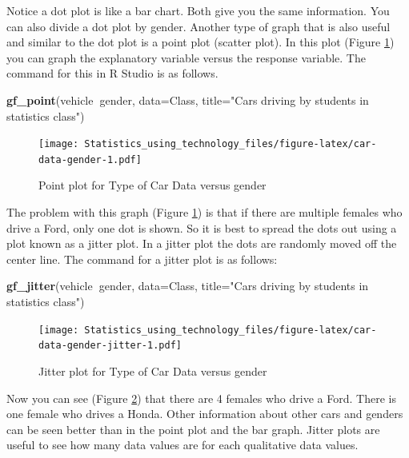 \documentclass[
]{book}
\newenvironment{Shaded}{\begin{snugshade}}{\end{snugshade}}
\newcommand{\DataTypeTok}[1]{\textcolor[rgb]{0.13,0.29,0.53}{#1}}
\newcommand{\KeywordTok}[1]{\textcolor[rgb]{0.13,0.29,0.53}{\textbf{#1}}}
\newcommand{\NormalTok}[1]{#1}
\newcommand{\OperatorTok}[1]{\textcolor[rgb]{0.81,0.36,0.00}{\textbf{#1}}}
\newcommand{\StringTok}[1]{\textcolor[rgb]{0.31,0.60,0.02}{#1}}
\begin{document}
Notice a dot plot is like a bar chart. Both give you the same information. You can also divide a dot plot by gender. Another type of graph that is also useful and similar to the dot plot is a point plot (scatter plot). In this plot (Figure \ref{fig:car-data-gender}) you can graph the explanatory variable versus the response variable. The command for this in R Studio is as follows.



\begin{Shaded}
\begin{Highlighting}[]
\KeywordTok{gf_point}\NormalTok{(vehicle}\OperatorTok{~}\NormalTok{gender, }\DataTypeTok{data=}\NormalTok{Class, }\DataTypeTok{title=}\StringTok{"Cars driving by students in statistics class"}\NormalTok{)}
\end{Highlighting}
\end{Shaded}

\begin{figure}
\centering
\texttt{[image: Statistics\_using\_technology\_files/figure-latex/car-data-gender-1.pdf]}
\caption{\label{fig:car-data-gender}Point plot for Type of Car Data versus gender}
\end{figure}

The problem with this graph (Figure \ref{fig:car-data-gender}) is that if there are multiple females who drive a Ford, only one dot is shown. So it is best to spread the dots out using a plot known as a jitter plot. In a jitter plot the dots are randomly moved off the center line. The command for a jitter plot is as follows:



\begin{Shaded}
\begin{Highlighting}[]
\KeywordTok{gf_jitter}\NormalTok{(vehicle}\OperatorTok{~}\NormalTok{gender, }\DataTypeTok{data=}\NormalTok{Class, }\DataTypeTok{title=}\StringTok{"Cars driving by students in statistics class"}\NormalTok{)}
\end{Highlighting}
\end{Shaded}

\begin{figure}
\centering
\texttt{[image: Statistics\_using\_technology\_files/figure-latex/car-data-gender-jitter-1.pdf]}
\caption{\label{fig:car-data-gender-jitter}Jitter plot for Type of Car Data versus gender}
\end{figure}

Now you can see (Figure \ref{fig:car-data-gender-jitter}) that there are 4 females who drive a Ford. There is one female who drives a Honda. Other information about other cars and genders can be seen better than in the point plot and the bar graph. Jitter plots are useful to see how many data values are for each qualitative data values.
\end{document}
